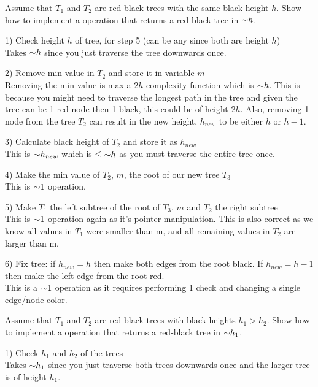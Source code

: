 \begin{problem}
\begin{questions}
\item Assume that $T_1$ and $T_2$ are red-black trees with the same black height $h$. Show how to implement a  operation that returns a red-black tree in $\mathord{\sim}h$.

1) Check height $h$ of tree, for step 5 (can be any since both are height $h$)\\
Takes $\mathord{\sim}h$ since you just traverse the tree downwards once.

2) Remove min value in $T_2$ and store it in variable $m$\\
Removing the min value is max a $2h$ complexity function which is $\mathord{\sim}h$. This is because you might need to traverse the longest path in the tree and given the tree can be 1 red node then 1 black, this could be of height $2h$.
Also, removing 1 node from the tree $T_2$ can result in the new height, $h_{new}$ to be either $h$ or $h-1$.

3) Calculate black height of $T_2$ and store it as $h_{new}$\\
This is $\mathord{\sim}h_{new}$ which is $\leq \mathord{\sim}h$ as you must traverse the entire tree once. 

4) Make the min value of $T_2$, $m$, the root of our new tree $T_3$\\
This is $\mathord{\sim}1$ operation.

5) Make $T_1$ the left subtree of the root of $T_3$, $m$ and $T_2$ the right subtree\\
This is $\mathord{\sim}1$ operation again as it's pointer manipulation. 
This is also correct as we know all values in $T_1$ were smaller than m, and all remaining values in $T_2$ are larger than m.

6) Fix tree: if $h_{new} = h$ then make both edges from the root black. If $h_{new} = h-1$ then make the left edge from the root red.\\
This is a $\mathord{\sim}1$ operation as it requires performing 1 check and changing a single edge/node color. 

\item Assume that $T_1$ and $T_2$ are red-black trees with black heights $h_1 > h_2$. Show how to implement a  operation that returns a red-black tree in $\mathord{\sim}h_1$.

1) Check $h_1$ and $h_2$ of the trees\\
Takes $\mathord{\sim}h_1$ since you just traverse both trees downwards once and the larger tree is of height $h_1$.


\end{questions}
\end{problem}
